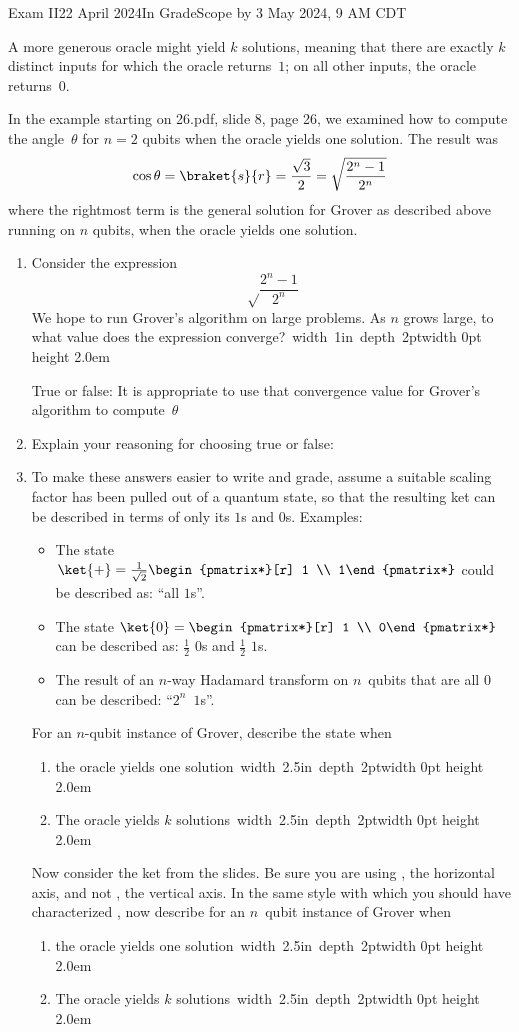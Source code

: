 \documentclass[12pt]{article}
\def\Obox#1{\Ovalbox{\hbox to 1ex{\vrule width 0pt height 1ex\hss #1\hss}}}
\def\TFMarked#1#2{\ \stackbox[l][m]{\Obox{#1}~\textbf{true}\\\Obox{#2}~\textbf{false}}}
\def\TF{\TFMarked{\relax}{\relax}}
\newcommand{\Blank}[1][1in]{\mbox{\vrule width #1 depth 2pt}\vrule width 0pt height 2.0em}
\def\SQB#1#2{%
\ensuremath{%
\begin{pmatrix*}[r] #1 \\ #2\end{pmatrix*}}}
\begin{document}
\begin{assignment}{Exam II}{22 April 2024}{In GradeScope by 3 May 2024, 9 AM CDT}
\begin{enumerate}
A more generous oracle might yield $k$ solutions, meaning that there are exactly $k$ distinct inputs for which the oracle returns~$1$;  on all other inputs, the oracle returns~$0$.

In the example starting on 26.pdf, slide 8, page 26, we examined how to compute the angle~$\theta$ for $n=2$ qubits when the oracle yields one solution.  The result was
\[ \cos{\theta} = \braket{s}{r} = \frac{\sqrt{3}}{2} = \sqrt\frac{2^{n}-1}{2^{n}} \]
where the rightmost term is the general solution for Grover as described above running on $n$ qubits, when the oracle yields one solution.
\begin{enumerate}
    \item Consider the expression  \[ \sqrt\frac{2^{n}-1}{2^{n}}\]
     We hope to run Grover's algorithm on large problems.  As $n$ grows large, to what value does the expression converge?~\Blank{}
     
     True or false: It is appropriate to use that convergence value for Grover's algorithm to compute~$\theta$~\TF{}
     \item Explain your reasoning for choosing true or false:
     \LeaveSpace{0.75in}
     \item To make these answers easier to write and grade, assume a suitable scaling factor has been pulled out of a quantum state, so that the resulting ket can be described in terms of only its $1$s and $0$s.  Examples:
     \begin{itemize}
         \item The state $\ket{+}=\frac{1}{\sqrt{2}}\SQB{1}{1}$ could be described as:  ``all $1$s''.  
         \item The state $\ket{0} = \SQB{1}{0}$ can be described as: $\frac{1}{2}$ $0$s and $\frac{1}{2}$ $1$s.
         \item The result of an $n$-way Hadamard transform on $n$~qubits that are all $0$ can be described: ``$2^{n}$~$1$s''.
    \end{itemize}
  For an $n$-qubit instance of Grover, describe the state  when 
         \begin{enumerate} 
           \item the oracle yields one solution~\Blank[2.5in]{}
           \item The oracle yields $k$ solutions~\Blank[2.5in]{}
        \end{enumerate}
    Now consider the ket  from the slides.  Be sure you are using , the horizontal axis, and not , the vertical axis.  In the same style with which you should have characterized , now describe  for an $n$~qubit instance of Grover when
        \begin{enumerate} 
           \item the oracle yields one solution~\Blank[2.5in]{}
           \item The oracle yields $k$ solutions~\Blank[2.5in]{}
        \end{enumerate}
         

\end{enumerate}
\end{enumerate}
\end{assignment}
\end{document}
